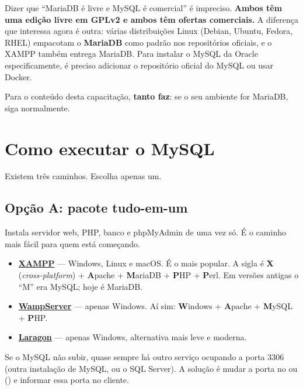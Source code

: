 \newpage

\begin{aviso}
Dizer que ``MariaDB é livre e MySQL é comercial'' é impreciso. \textbf{Ambos têm
uma edição livre em GPLv2 e ambos têm ofertas comerciais.} A diferença que
interessa agora é outra: várias distribuições Linux (Debian, Ubuntu, Fedora,
RHEL) empacotam o \textbf{MariaDB} como padrão nos repositórios oficiais, e o
XAMPP também entrega MariaDB. Para instalar o MySQL da Oracle
especificamente, é preciso adicionar o repositório oficial do MySQL ou usar
Docker.

Para o conteúdo desta capacitação, \textbf{tanto faz}: se o seu ambiente for
MariaDB, siga normalmente.
\end{aviso}

\section{Como executar o MySQL}

Existem três caminhos. Escolha apenas um.

\subsection{Opção A: pacote tudo-em-um}

Instala servidor web, PHP, banco e phpMyAdmin de uma vez só. É o caminho mais
fácil para quem está começando.

\begin{itemize}
    \item \href{https://www.apachefriends.org/}{\textbf{XAMPP}} --- Windows,
          Linux e macOS. É o mais popular. A sigla é \textbf{X}
          (\emph{cross-platform}) + \textbf{A}pache + \textbf{M}ariaDB +
          \textbf{P}HP + \textbf{P}erl. Em versões antigas o ``M'' era MySQL;
          hoje é MariaDB.
    \item \href{https://www.wampserver.com/}{\textbf{WampServer}} --- apenas
          Windows. Aí sim: \textbf{W}indows + \textbf{A}pache + \textbf{M}ySQL
          + \textbf{P}HP.
    \item \href{https://laragon.org/}{\textbf{Laragon}} --- apenas Windows,
          alternativa mais leve e moderna.
\end{itemize}

\begin{dica}
Se o MySQL não subir, quase sempre há outro serviço ocupando a porta 3306
(outra instalação de MySQL, ou o SQL Server). A solução é mudar a porta no
 ou  () e informar essa
porta no cliente.
\end{dica}


